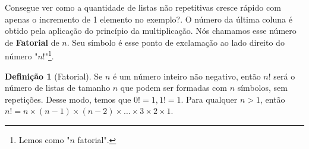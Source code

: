 \documentclass[a4paper,11pt,oneside]{book}
\theoremstyle{definition}
\theoremstyle{break}
\newtheorem{definition}{Definição}[section]
\begin{document}
Consegue ver como a quantidade de listas não repetitivas cresce rápido com apenas o incremento de 1 elemento no exemplo?. O número da última coluna é obtido pela aplicação do princípio da multiplicação. Nós chamamos esse número de \textbf{Fatorial} de $n$. Seu símbolo é esse ponto de exclamação ao lado direito do número "$n!$"\footnote{Lemos como "$n$ fatorial".}.

\begin{definition}[Fatorial]
Se $n$ é um número inteiro não negativo, então $n!$ será o número de listas de tamanho $n$ que podem ser formadas com $n$ símbolos, sem repetições. Desse modo, temos que $0! = 1, 1! = 1$. Para qualquer $n > 1$, então $n! = n \times (n - 1) \times (n - 2) \times \dots \times 3 \times 2 \times 1 $.
\end{definition}
\end{document}
